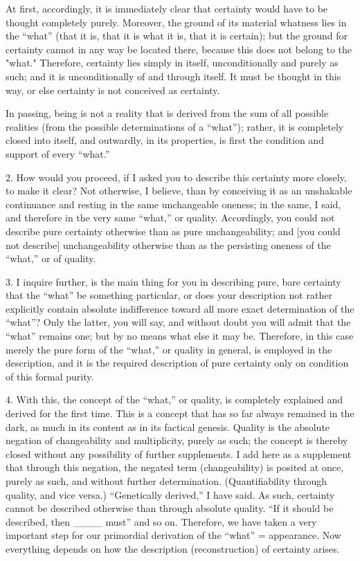 At first, accordingly, it is immediately clear
that certainty would have to be thought completely purely.
Moreover, the ground of its material whatness lies in the “what”
(that it is, that it is what it is, that it is certain);
but the ground for certainty cannot in any way be located there,
because this does not belong to the "what."
Therefore, certainty lies simply in itself,
unconditionally and purely as such;
and it is unconditionally of and through itself.
It must be thought in this way,
or else certainty is not conceived as certainty.

In passing, being is not a reality that is
derived from the sum of all possible realities
(from the possible determinations of a “what”);
rather, it is completely closed into itself,
and outwardly, in its properties, is
first the condition and support of every “what.”

2. How would you proceed, if I asked you
to describe this certainty more closely, to make it clear?
Not otherwise, I believe, than by conceiving it
as an unshakable continuance and resting
in the same unchangeable oneness;
in the same, I said, and therefore
in the very same “what,” or quality.
Accordingly, you could not describe pure certainty otherwise
than as pure unchangeability;
and [you could not describe] unchangeability otherwise
than as the persisting oneness of the “what,” or of quality.

3. I inquire further, is the main thing for you
in describing pure, bare certainty
that the “what” be something particular,
or does your description not rather explicitly contain
absolute indifference toward all more exact determination of the “what”?
Only the latter, you will say, and without doubt
you will admit that the “what” remains one;
but by no means what else it may be.
Therefore, in this case merely the pure form of the “what,”
or quality in general, is employed in the description,
and it is the required description of pure certainty
only on condition of this formal purity.

4. With this, the concept of the “what,” or quality,
is completely explained and derived for the first time.
This is a concept that has so far always remained in the dark,
as much in its content as in its factical genesis.
Quality is the absolute negation of
changeability and multiplicity, purely as such;
the concept is thereby closed without
any possibility of further supplements.
I add here as a supplement that through this negation,
the negated term (changeability) is posited at once,
purely as such, and without further determination.
(Quantifiability through quality, and vice versa.)
“Genetically derived,” I have said.
As such, certainty cannot be described otherwise
than through absolute quality.
“If it should be described, then ____ must” and so on.
Therefore, we have taken a very important step
for our primordial derivation of the “what” = appearance.
Now everything depends on how
the description (reconstruction) of certainty arises.

